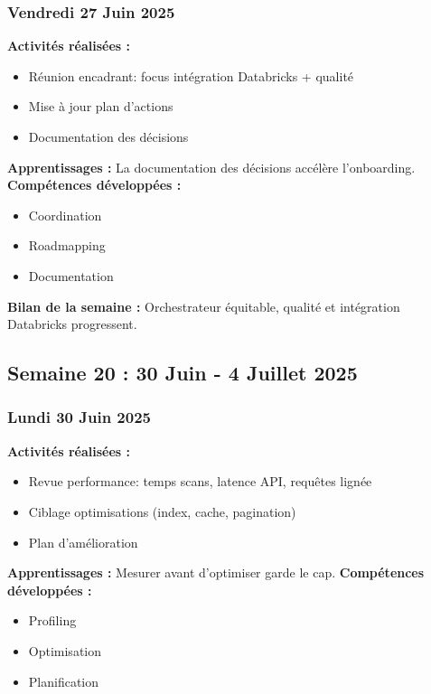 \documentclass[12pt,a4paper]{article}
\begin{document}
\subsubsection{Vendredi 27 Juin 2025}
\textbf{Activités réalisées :}
\begin{itemize}
    \item Réunion encadrant: focus intégration Databricks + qualité
    \item Mise à jour plan d'actions
    \item Documentation des décisions
\end{itemize}
\textbf{Apprentissages :} La documentation des décisions accélère l'onboarding.
\textbf{Compétences développées :}
\begin{itemize}
    \item Coordination
    \item Roadmapping
    \item Documentation
\end{itemize}
\textbf{Bilan de la semaine :} Orchestrateur équitable, qualité et intégration Databricks progressent.

\clearpage
\subsection{Semaine 20 : 30 Juin - 4 Juillet 2025}

\subsubsection{Lundi 30 Juin 2025}
\textbf{Activités réalisées :}
\begin{itemize}
    \item Revue performance: temps scans, latence API, requêtes lignée
    \item Ciblage optimisations (index, cache, pagination)
    \item Plan d'amélioration
\end{itemize}
\textbf{Apprentissages :} Mesurer avant d'optimiser garde le cap.
\textbf{Compétences développées :}
\begin{itemize}
    \item Profiling
    \item Optimisation
    \item Planification
\end{itemize}
\end{document}

